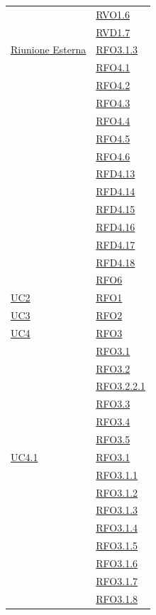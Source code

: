\begin{longtable}{|>{\centering}m{5cm}|m{5cm}<{\centering}|}
& \hyperlink{RVO1.6}{RVO1.6}\\
& \hyperlink{RVD1.7}{RVD1.7}\\ \hline
\hyperlink{Riunione Esterna}{Riunione Esterna} & \hyperlink{RFO3.1.3}{RFO3.1.3}\\
& \hyperlink{RFO4.1}{RFO4.1}\\
& \hyperlink{RFO4.2}{RFO4.2}\\
& \hyperlink{RFO4.3}{RFO4.3}\\
& \hyperlink{RFO4.4}{RFO4.4}\\
& \hyperlink{RFO4.5}{RFO4.5}\\
& \hyperlink{RFO4.6}{RFO4.6}\\
& \hyperlink{RFD4.13}{RFD4.13}\\
& \hyperlink{RFD4.14}{RFD4.14}\\
& \hyperlink{RFD4.15}{RFD4.15}\\
& \hyperlink{RFD4.16}{RFD4.16}\\
& \hyperlink{RFD4.17}{RFD4.17}\\
& \hyperlink{RFD4.18}{RFD4.18}\\
& \hyperlink{RFO6}{RFO6}\\ \hline
\hyperref[UC2]{UC2} & \hyperlink{RFO1}{RFO1}\\ \hline
\hyperref[UC3]{UC3} & \hyperlink{RFO2}{RFO2}\\ \hline
\hyperref[UC4]{UC4} & \hyperlink{RFO3}{RFO3}\\
& \hyperlink{RFO3.1}{RFO3.1}\\
& \hyperlink{RFO3.2}{RFO3.2}\\
& \hyperlink{RFO3.2.2.1}{RFO3.2.2.1}\\
& \hyperlink{RFO3.3}{RFO3.3}\\
& \hyperlink{RFO3.4}{RFO3.4}\\
& \hyperlink{RFO3.5}{RFO3.5}\\ \hline
\hyperref[UC4.1]{UC4.1} & \hyperlink{RFO3.1}{RFO3.1}\\
& \hyperlink{RFO3.1.1}{RFO3.1.1}\\
& \hyperlink{RFO3.1.2}{RFO3.1.2}\\
& \hyperlink{RFO3.1.3}{RFO3.1.3}\\
& \hyperlink{RFO3.1.4}{RFO3.1.4}\\
& \hyperlink{RFO3.1.5}{RFO3.1.5}\\
& \hyperlink{RFO3.1.6}{RFO3.1.6}\\
& \hyperlink{RFO3.1.7}{RFO3.1.7}\\
& \hyperlink{RFO3.1.8}{RFO3.1.8}\\ \hline

\end{longtable}
